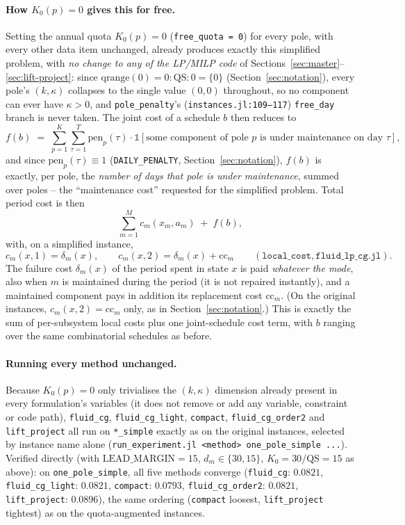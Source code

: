 \documentclass[11pt]{article}
\begin{document}
\paragraph{How $K_0(p) = 0$ gives this for free.} Setting the annual quota
$K_0(p) = 0$ (\texttt{free\_quota = 0}) for every pole, with every other data item
unchanged, already produces exactly this simplified problem, with \emph{no change to any
of the LP/MILP code} of Sections~\ref{sec:master}--\ref{sec:lift-project}: since
$\mathrm{qrange}(0) = 0\!:\!\mathrm{QS}\!:\!0 = \{0\}$ (Section~\ref{sec:notation}), every
pole's $(k,\kappa)$ collapses to the single value $(0,0)$ throughout, so no component can
ever have $\kappa > 0$, and \texttt{pole\_penalty}'s (\texttt{instances.jl:109--117})
\texttt{free\_day} branch is never taken. The joint cost of a schedule $b$ then reduces to
\[
  f(b) \;=\; \sum_{p=1}^{K} \sum_{\tau=1}^{T} \mathrm{pen}_p(\tau) \cdot \mathbb 1[\text{some component of pole } p \text{ is under maintenance on day } \tau],
\]
and since $\mathrm{pen}_p(\tau) \equiv 1$ (\texttt{DAILY\_PENALTY}, Section~\ref{sec:notation}),
$f(b)$ is exactly, per pole, the \emph{number of days that pole is under maintenance},
summed over poles -- the ``maintenance cost'' requested for the simplified problem. Total
period cost is then
\[
  \sum_{m=1}^{M} c_m(x_m, a_m) \;+\; f(b),
\]
with, on a simplified instance,
\[
  c_m(x,1) = \delta_m(x), \qquad c_m(x,2) = \delta_m(x) + \mathrm{cc}_m
  \qquad (\texttt{local\_cost}, \texttt{fluid\_lp\_cg.jl}).
\]
The failure cost $\delta_m(x)$ of the period spent in state $x$ is paid \emph{whatever the
mode}, also when $m$ is maintained during the period (it is not repaired instantly), and a
maintained component pays in addition its replacement cost $\mathrm{cc}_m$. (On the original
instances, $c_m(x,2) = \mathrm{cc}_m$ only, as in Section~\ref{sec:notation}.) This is
exactly the sum of per-subsystem local costs plus one joint-schedule cost term, with $b$
ranging over the same combinatorial schedules as before.

\paragraph{Running every method unchanged.} Because $K_0(p) = 0$ only trivialises the
$(k,\kappa)$ dimension already present in every formulation's variables (it does not
remove or add any variable, constraint or code path), \texttt{fluid\_cg},
\texttt{fluid\_cg\_light}, \texttt{compact}, \texttt{fluid\_cg\_order2} and
\texttt{lift\_project} all run on \texttt{*\_simple} exactly as on the original instances,
selected by instance name alone (\texttt{run\_experiment.jl <method> one\_pole\_simple
...}). Verified directly (with $\mathrm{LEAD\_MARGIN}=15$, $d_m \in \{30,15\}$,
$K_0=30$/$\mathrm{QS}=15$ as above): on \texttt{one\_pole\_simple}, all five methods
converge (\texttt{fluid\_cg}: $0.0821$, \texttt{fluid\_cg\_light}: $0.0821$,
\texttt{compact}: $0.0793$, \texttt{fluid\_cg\_order2}: $0.0821$, \texttt{lift\_project}:
$0.0896$), the same ordering (\texttt{compact} loosest, \texttt{lift\_project} tightest) as
on the quota-augmented instances.
\end{document}
